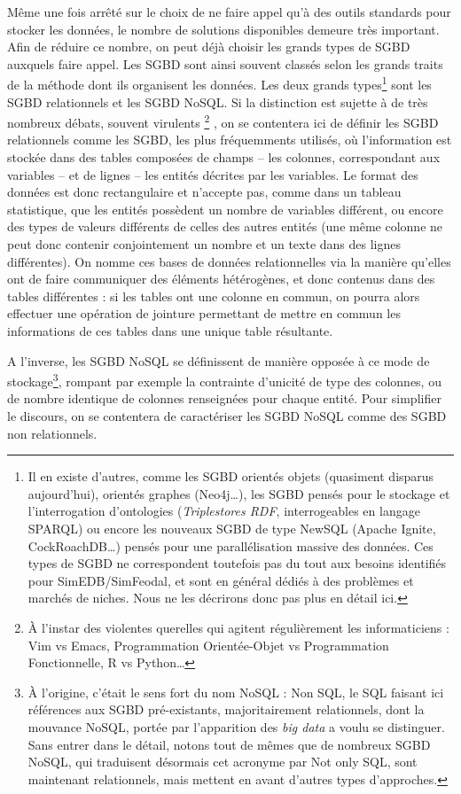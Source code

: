 			Même une fois arrêté sur le choix de ne faire appel qu'à des outils standards pour stocker les données, le nombre de solutions disponibles demeure très important.
			Afin de réduire ce nombre, on peut déjà choisir les grands types de SGBD auxquels faire appel.
			Les SGBD sont ainsi souvent classés selon les grands traits de la méthode dont ils organisent les données.
			Les deux grands types\footnote{
				Il en existe d'autres, comme les SGBD orientés objets (quasiment disparus aujourd'hui), orientés graphes (Neo4j\ldots), les SGBD pensés pour le stockage et l'interrogation d'ontologies (\textit{Triplestores RDF}, interrogeables en langage SPARQL) ou encore les nouveaux SGBD de type \og NewSQL \fg{} (Apache Ignite, CockRoachDB\ldots) pensés pour une parallélisation massive des données. Ces types de SGBD ne correspondent toutefois pas du tout aux besoins identifiés pour SimEDB/SimFeodal, et sont en général dédiés à des problèmes et marchés de niches. Nous ne les décrirons donc pas plus en détail ici.
			} sont les SGBD \og relationnels\fg{} et les SGBD \og NoSQL\fg{}.
			Si la distinction est sujette à de très nombreux débats, souvent virulents
			\footnote{
				À l'instar des violentes querelles qui agitent régulièrement les informaticiens : Vim vs Emacs, Programmation Orientée-Objet vs Programmation Fonctionnelle, R vs Python\ldots
			}
			, on se contentera ici de définir les SGBD relationnels comme les SGBD, les plus fréquemments utilisés, où l'information est stockée dans des tables composées de champs -- les colonnes, correspondant aux variables -- et de lignes -- les entités décrites par les variables.
			Le format des données est donc rectangulaire et n'accepte pas, comme dans un tableau statistique, que les entités possèdent un nombre de variables différent, ou encore des types de valeurs différents de celles des autres entités (une même colonne ne peut donc contenir conjointement un nombre et un texte dans des lignes différentes).
			On nomme ces bases de données relationnelles via la manière qu'elles ont de faire communiquer des éléments hétérogènes, et donc contenus dans des tables différentes : si les tables ont une colonne en commun, on pourra alors effectuer une opération de jointure permettant de mettre en commun les informations de ces tables dans une unique table résultante.
			
			A l'inverse, les SGBD NoSQL se définissent de manière opposée à ce mode de stockage\footnote{
				À l'origine, c'était le sens fort du nom \og NoSQL \fg{} : Non SQL, le SQL faisant ici références aux SGBD pré-existants, majoritairement relationnels, dont la mouvance NoSQL, portée par l'apparition des \og \textit{big data} \fg{} a voulu se distinguer.
				Sans entrer dans le détail, notons tout de mêmes que de nombreux SGBD NoSQL, qui traduisent désormais cet acronyme par \og Not only SQL\fg{}, sont maintenant relationnels, mais mettent en avant d'autres types d'approches.
			}, rompant par exemple la contrainte d'unicité de type des colonnes, ou de nombre identique de colonnes renseignées pour chaque entité. Pour simplifier le discours, on se contentera de caractériser les SGBD NoSQL comme des SGBD non relationnels.
		
